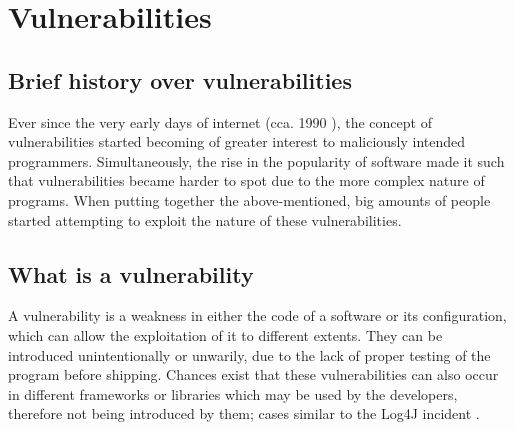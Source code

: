 
\chapter{Vulnerabilities}\label{cap:vulnerabilities}

\section{Brief history over vulnerabilities}

Ever since the very early days of internet (cca. 1990 \cite{curran2012rethinking}), the concept of vulnerabilities started becoming of greater interest to maliciously intended programmers. Simultaneously, the rise in the popularity of software made it such that vulnerabilities became harder to spot due to the more complex nature of programs. When putting together the above-mentioned, big amounts of people started attempting to exploit the nature of these vulnerabilities. 

\section{What is a vulnerability}\label{sect:whatisavulnerability}

A vulnerability is a weakness in either the code of a software or its configuration, which can allow the exploitation of it to different extents. They can be introduced unintentionally or unwarily, due to the lack of proper testing of the program before shipping. Chances exist that these vulnerabilities can also occur in different frameworks or libraries which may be used by the developers, therefore not being introduced by them; cases similar to the Log4J incident \cite{hiesgen2022race}. 



